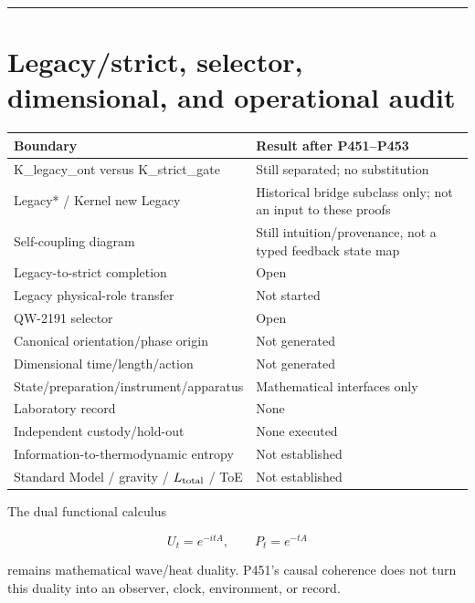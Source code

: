 \documentclass[11pt,a4paper,openany]{report}
\begin{document}
\par\medskip\hrule\medskip

\chapter{Legacy/\allowbreak{}strict, selector, dimensional, and operational audit}

\begin{center}
\begingroup\small
\setlength{\tabcolsep}{2.5pt}
\renewcommand{\arraystretch}{1.16}
\begin{longtable}{@{}p{}p{}@{}}
\toprule
\textbf{Boundary} & \textbf{Result after P451--P453} \\
\midrule
\endhead
K\_legacy\_ont versus K\_strict\_gate & Still separated; no substitution \\
Legacy* /\allowbreak{} Kernel new Legacy & Historical bridge subclass only; not an input to these proofs \\
Self-coupling diagram & Still intuition/\allowbreak{}provenance, not a typed feedback state map \\
Legacy-to-strict completion & Open \\
Legacy physical-role transfer & Not started \\
QW-2191 selector & Open \\
Canonical orientation/\allowbreak{}phase origin & Not generated \\
Dimensional time/\allowbreak{}length/\allowbreak{}action & Not generated \\
State/\allowbreak{}preparation/\allowbreak{}instrument/\allowbreak{}apparatus & Mathematical interfaces only \\
Laboratory record & None \\
Independent custody/\allowbreak{}hold-out & None executed \\
Information-to-thermodynamic entropy & Not established \\
Standard Model /\allowbreak{} gravity /\allowbreak{} \(L_{\rm total}\) /\allowbreak{} ToE & Not established \\
\bottomrule
\end{longtable}
\endgroup
\end{center}

The dual functional calculus

\[
U_t=e^{-itA},\qquad P_t=e^{-tA}
\]

remains mathematical wave/\allowbreak{}heat duality. P451's causal coherence does not turn this duality into an observer, clock, environment, or record.
\end{document}
